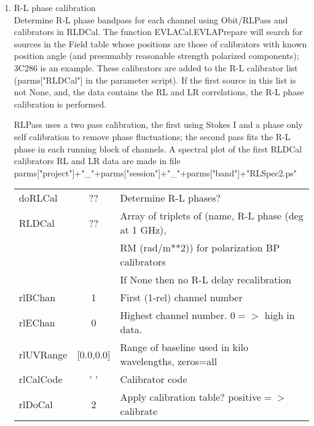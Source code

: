 \documentclass[11pt]{article}
\begin{document}
\begin{enumerate}
\begin{center}
\begin{tabular}{|l|c|l|}
\hline
\end{tabular}
\end{center}
%
\newpage
\item R-L phase calibration\\
Determine R-L phase bandpass for each channel using Obit/RLPass
and calibrators in RLDCal.
The function EVLACal.EVLAPrepare will search for sources in the Field
table whose positions are those of calibrators with known position
angle (and presumably reasonable strength polarized components);
3C286 is an example.
These calibrators are added to the R-L calibrator list (parms["RLDCal"]
in the parameter script).
If the first source in this list is not None, and, the data contains
the RL and LR correlations, the R-L phase calibration is performed. 

RLPass uses a two pass calibration, the first using Stokes I and a
phase only self calibration to remove phase fluctuations; the second
pass fits the R-L phase in each running block of channels.
A spectral plot of the  first RLDCal calibrators RL and LR data are made in file\\
parms["project"]+"\_"+parms["session"]+"\_"+parms["band"]+"RLSpec2.ps"\\
\begin{center}
\begin{tabular}{|l|c|l|}
\hline
doRLCal  & ??  & Determine R-L phases? \\
RLDCal   & ??  &  Array of triplets of (name, R-L phase (deg at 1 GHz), \\
 & &  RM (rad/m**2)) for polarization BP calibrators\\
 & &  If None then no R-L delay recalibration \\
rlBChan     & 1            & First (1-rel) channel number\\
rlEChan     & 0            & Highest channel number. $0=>$ high in data. \\
rlUVRange   &  [0.0,0.0]   & Range of baseline used in kilo wavelengths, zeros=all\\
rlCalCode   & '  '         & Calibrator code\\
rlDoCal     & 2            & Apply calibration table? positive$=>$calibrate\\

\end{tabular}
\end{center}
\end{enumerate}
\end{document}
